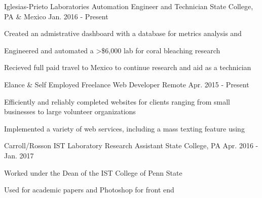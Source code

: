 

\begin{cventries}

  \cventry
    {Iglesias-Prieto Laboratories} %
    {Automation Engineer and Technician} %
    {State College, PA \& Mexico} %
    {Jan. 2016 - Present} %
    {
      \begin{cvitems} %
        \item {Created an admistrative dashboard with a  database for metrics analysis and }
        \item {Engineered and automated a >\$6,000 lab for coral bleaching research}
        \item {Recieved full paid travel to Mexico to continue research and aid as a technician}
      \end{cvitems}
    }

  \cventry
    {Elance \& Self Employed}
    {Freelance Web Developer} %
    {Remote} %
    {Apr. 2015 - Present } %
    {
      \begin{cvitems} %
        \item {Efficiently and reliably completed websites for clients ranging from small businesses to large volunteer organizations}
	\item {Implemented a variety of web services, including a mass texting feature using }
      \end{cvitems}
    }
   
  \cventry
    {Carroll/Rosson IST Laboratory} %
    {Research Assistant} %
    {State College, PA} %
    {Apr. 2016 - Jan. 2017} %
    {
      \begin{cvitems} %
        \item {Worked under the Dean of the IST College of Penn State}
	\item {Used  for academic papers and Photoshop for front end }
      \end{cvitems}
    }
   


\end{cventries}
